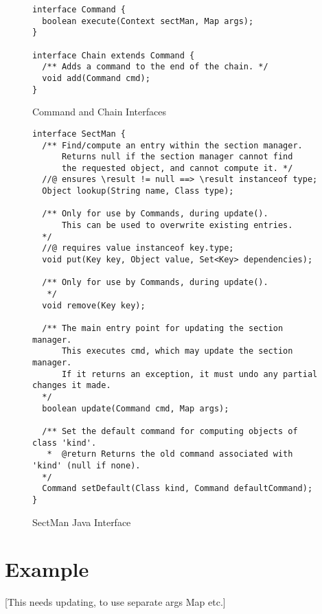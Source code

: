 \documentclass{llncs} %
\begin{document}
\begin{figure}[htbp]
  \centering
\begin{small}
\begin{verbatim}
interface Command {
  boolean execute(Context sectMan, Map args);
}

interface Chain extends Command {
  /** Adds a command to the end of the chain. */
  void add(Command cmd);
}
\end{verbatim}
\end{small}
  \caption{Command and Chain Interfaces}
  \label{fig:command}
\end{figure}

\begin{figure}[htbp]
  \centering
\begin{small}
\begin{verbatim}
interface SectMan {
  /** Find/compute an entry within the section manager.
      Returns null if the section manager cannot find
      the requested object, and cannot compute it. */ 
  //@ ensures \result != null ==> \result instanceof type;
  Object lookup(String name, Class type);

  /** Only for use by Commands, during update().
      This can be used to overwrite existing entries.
  */
  //@ requires value instanceof key.type;
  void put(Key key, Object value, Set<Key> dependencies);

  /** Only for use by Commands, during update().
   */
  void remove(Key key);

  /** The main entry point for updating the section manager.
      This executes cmd, which may update the section manager.
      If it returns an exception, it must undo any partial changes it made.
  */
  boolean update(Command cmd, Map args);

  /** Set the default command for computing objects of class 'kind'.
   *  @return Returns the old command associated with 'kind' (null if none).
  */
  Command setDefault(Class kind, Command defaultCommand);
}
\end{verbatim}
\end{small}
  \caption{SectMan Java Interface}
  \label{fig:sectman}
\end{figure}


\section{Example}

[This needs updating, to use separate args Map etc.]
\end{document}
